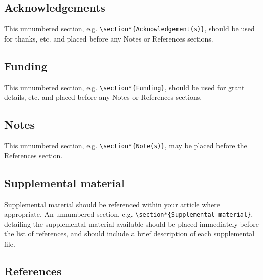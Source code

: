 \documentclass{gCMB2e}
\begin{document}
\subsection{Acknowledgements}

This unnumbered section, e.g. \verb"\section*{Acknowledgement(s)}", should be used for thanks, etc.
and placed before any Notes or References sections.


\subsection{Funding}

This unnumbered section, e.g. \verb"\section*{Funding}", should be used for grant details, etc.
and placed before any Notes or References sections.


\subsection{Notes}

This unnumbered section, e.g. \verb"\section*{Note(s)}", may be placed before the References section.


\subsection{Supplemental material}

Supplemental material should be referenced within your article where appropriate. An unnumbered section, e.g. \verb"\section*{Supplemental material}", detailing the supplemental material available should be placed immediately before the list of references, and should include a brief description of each supplemental file.


\subsection{References}\label{refs}
\end{document}
